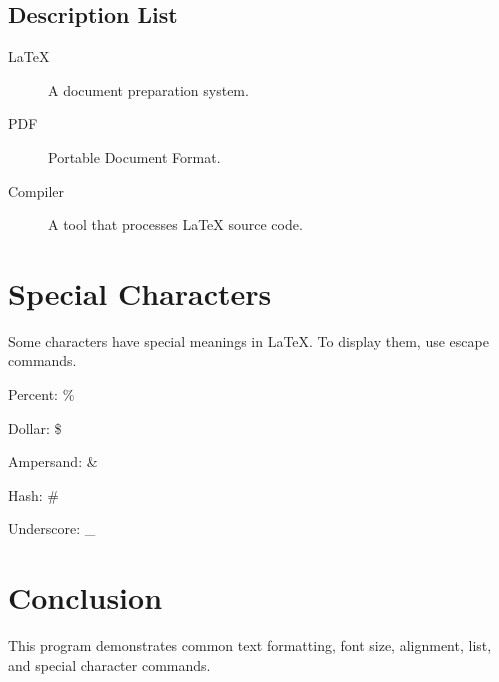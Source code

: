 \documentclass[12pt,a4paper]{article}
\begin{document}
\subsection{Description List}

\begin{description}
    \item[LaTeX] A document preparation system.
    \item[PDF] Portable Document Format.
    \item[Compiler] A tool that processes LaTeX source code.
\end{description}

\section{Special Characters}

Some characters have special meanings in LaTeX.
To display them, use escape commands.

Percent: \%

Dollar: \$

Ampersand: \&

Hash: \#

Underscore: \_

\section{Conclusion}

This program demonstrates common text formatting,
font size, alignment, list, and special character commands.
\end{document}
